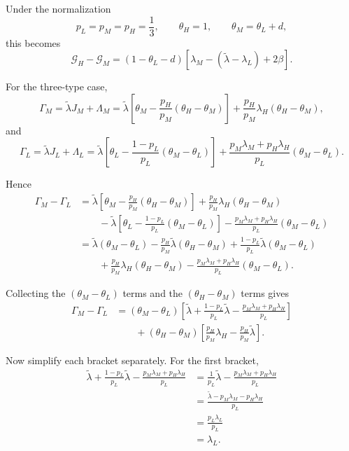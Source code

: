 \documentclass[11pt]{article}
\begin{document}
Under the normalization
\[
p_L=p_M=p_H=\frac13,\qquad \theta_H=1,\qquad \theta_M=\theta_L+d,
\]
this becomes
\[
\mathcal G_H-\mathcal G_M
=
\left(1-\theta_L-d\right)
\left[
\lambda_M-\left(\tilde\lambda-\lambda_L\right)+2\beta
\right].
\]

For the three-type case,
\[
\Gamma_M=\tilde\lambda J_M+\Lambda_M
=
\tilde\lambda\left[\theta_M-\frac{p_H}{p_M}\left(\theta_H-\theta_M\right)\right]
+
\frac{p_H}{p_M}\lambda_H\left(\theta_H-\theta_M\right),
\]
and
\[
\Gamma_L=\tilde\lambda J_L+\Lambda_L
=
\tilde\lambda\left[\theta_L-\frac{1-p_L}{p_L}\left(\theta_M-\theta_L\right)\right]
+
\frac{p_M\lambda_M+p_H\lambda_H}{p_L}\left(\theta_M-\theta_L\right).
\]

Hence
\begin{align*}
\Gamma_M-\Gamma_L
&=
\tilde\lambda\left[\theta_M-\frac{p_H}{p_M}\left(\theta_H-\theta_M\right)\right]
+
\frac{p_H}{p_M}\lambda_H\left(\theta_H-\theta_M\right) \\
&\qquad
-
\tilde\lambda\left[\theta_L-\frac{1-p_L}{p_L}\left(\theta_M-\theta_L\right)\right]
-
\frac{p_M\lambda_M+p_H\lambda_H}{p_L}\left(\theta_M-\theta_L\right) \\
&=
\tilde\lambda\left(\theta_M-\theta_L\right)
-
\frac{p_H}{p_M}\tilde\lambda\left(\theta_H-\theta_M\right)
+
\frac{1-p_L}{p_L}\tilde\lambda\left(\theta_M-\theta_L\right) \\
&\qquad
+
\frac{p_H}{p_M}\lambda_H\left(\theta_H-\theta_M\right)
-
\frac{p_M\lambda_M+p_H\lambda_H}{p_L}\left(\theta_M-\theta_L\right).
\end{align*}

Collecting the \(\left(\theta_M-\theta_L\right)\) terms and the \(\left(\theta_H-\theta_M\right)\) terms gives
\begin{align*}
\Gamma_M-\Gamma_L
&=
\left(\theta_M-\theta_L\right)
\left[
\tilde\lambda+\frac{1-p_L}{p_L}\tilde\lambda
-
\frac{p_M\lambda_M+p_H\lambda_H}{p_L}
\right] \\
&\qquad
+
\left(\theta_H-\theta_M\right)
\left[
\frac{p_H}{p_M}\lambda_H-\frac{p_H}{p_M}\tilde\lambda
\right].
\end{align*}

Now simplify each bracket separately. For the first bracket,
\begin{align*}
\tilde\lambda+\frac{1-p_L}{p_L}\tilde\lambda
-
\frac{p_M\lambda_M+p_H\lambda_H}{p_L}
&=
\frac{1}{p_L}\tilde\lambda
-
\frac{p_M\lambda_M+p_H\lambda_H}{p_L} \\
&=
\frac{\tilde\lambda-p_M\lambda_M-p_H\lambda_H}{p_L} \\
&=
\frac{p_L\lambda_L}{p_L} \\
&=
\lambda_L.
\end{align*}
\end{document}
